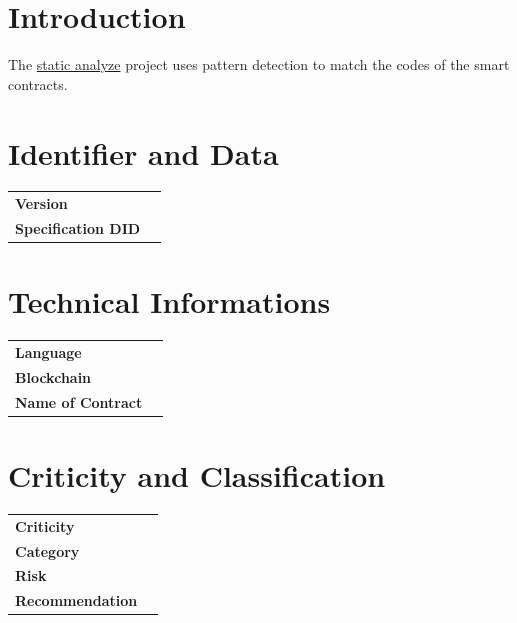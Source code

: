 \documentclass[a4paper,10pt]{article}
\newcommand{\specificationDID}{}
\newcommand{\version}{}
\newcommand{\languageChange}{}
\newcommand{\blockchain}{}
\newcommand{\name}{}
\newcommand{\criticity}{}
\newcommand{\recommendation}{}
\newcommand{\category}{}
\newcommand{\risk}{}
\begin{document}
\vspace{1,5cm}

\section{Introduction}
The \href{https://en.wikipedia.org/wiki/Static_program_analysis}{static analyze} project uses pattern detection to match the codes of the
smart contracts.

\section{Identifier and Data}

\begin{tabular}{p{} p{}}
\textbf{Version}                & \version \\
\vspace{0,05cm}
\textbf{Specification DID}      & \specificationDID \\
\end{tabular}

\bigskip

\section{Technical Informations} 
\begin{tabular}{p{} p{}}
\textbf{Language}               & \languageChange \\
\vspace{0,05cm}
\textbf{Blockchain}             & \blockchain \\
\vspace{0,05cm}
\textbf{Name of Contract}       & \name \\
\end{tabular}
\bigskip

\section{Criticity and Classification}
\begin{tabular}{p{} p{}}
\textbf{Criticity}              & \criticity \\
\vspace{0,05cm}
\textbf{Category}               & \category \\
\vspace{0,05cm}
\textbf{Risk}                   & \risk \\
\vspace{0,05cm}
\textbf{Recommendation}         & \recommendation \\
\end{tabular}
\bigskip
\end{document}
